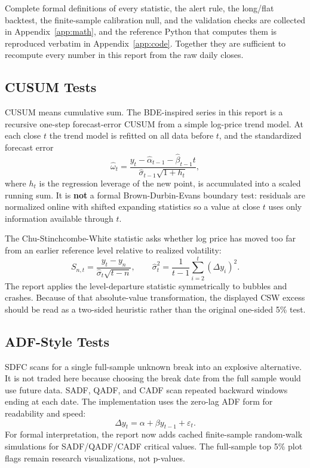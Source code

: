 \documentclass[11pt]{article}
\begin{document}
Complete formal definitions of every statistic, the alert rule, the long/flat backtest, the finite-sample calibration null, and the validation checks are collected in Appendix~\ref{app:math}, and the reference Python that computes them is reproduced verbatim in Appendix~\ref{app:code}. Together they are sufficient to recompute every number in this report from the raw daily closes.

\subsection{CUSUM Tests}

CUSUM means cumulative sum. The BDE-inspired series in this report is a recursive one-step forecast-error CUSUM from a simple log-price trend model. At each close $t$ the trend model is refitted on all data before $t$, and the standardized forecast error
\[
    \hat\omega_t = \frac{y_t - \hat\alpha_{t-1} - \hat\beta_{t-1} t}{\hat\sigma_{t-1}\sqrt{1 + h_t}},
\]
where $h_t$ is the regression leverage of the new point, is accumulated into a scaled running sum. It is \textbf{not} a formal Brown-Durbin-Evans boundary test: residuals are normalized online with shifted expanding statistics so a value at close $t$ uses only information available through $t$.

The Chu-Stinchcombe-White statistic asks whether log price has moved too far from an earlier reference level relative to realized volatility:
\[
    S_{n,t} = \frac{y_t-y_n}{\hat\sigma_t\sqrt{t-n}},
    \qquad
    \hat\sigma_t^2 = \frac{1}{t-1}\sum_{i=2}^t (\Delta y_i)^2.
\]
The report applies the level-departure statistic symmetrically to bubbles and crashes. Because of that absolute-value transformation, the displayed CSW excess should be read as a two-sided heuristic rather than the original one-sided 5\% test.

\subsection{ADF-Style Tests}

SDFC scans for a single full-sample unknown break into an explosive alternative. It is not traded here because choosing the break date from the full sample would use future data. SADF, QADF, and CADF scan repeated backward windows ending at each date. The implementation uses the zero-lag ADF form for readability and speed:
\[
    \Delta y_t = \alpha + \beta y_{t-1} + \varepsilon_t.
\]
For formal interpretation, the report now adds cached finite-sample random-walk simulations for SADF/QADF/CADF critical values. The full-sample top 5\% plot flags remain research visualizations, not p-values.
\end{document}
